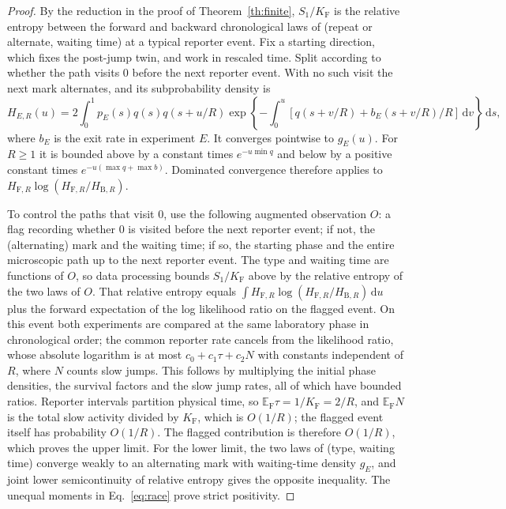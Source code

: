 \documentclass[11pt,a4paper]{article}
\newcommand{\F}{\mathrm F}
\newcommand{\B}{\mathrm B}
\newcommand{\dd}{\,\mathrm d}
\begin{document}
\begin{proof}
By the reduction in the proof of Theorem~\ref{th:finite}, $S_1/K_\F$ is the relative entropy between the forward and backward chronological laws of (repeat or alternate, waiting time) at a typical reporter event. Fix a starting direction, which fixes the post-jump twin, and work in rescaled time. Split according to whether the path visits $0$ before the next reporter event. With no such visit the next mark alternates, and its subprobability density is
\[
 H_{E,R}(u)=2\int_0^1 p_E(s)q(s)q(s+u/R)
 \exp\!\left\{-\int_0^u [q(s+v/R)+b_E(s+v/R)/R]\dd v\right\}\dd s,
\]
where $b_E$ is the exit rate in experiment $E$. It converges pointwise to $g_E(u)$. For $R\ge1$ it is bounded above by a constant times $e^{-u\min q}$ and below by a positive constant times $e^{-u(\max q+\max b)}$. Dominated convergence therefore applies to $H_{\F,R}\log(H_{\F,R}/H_{\B,R})$.

To control the paths that visit $0$, use the following augmented observation $O$: a flag recording whether $0$ is visited before the next reporter event; if not, the (alternating) mark and the waiting time; if so, the starting phase and the entire microscopic path up to the next reporter event. The type and waiting time are functions of $O$, so data processing bounds $S_1/K_\F$ above by the relative entropy of the two laws of $O$. That relative entropy equals $\int H_{\F,R}\log(H_{\F,R}/H_{\B,R})\dd u$ plus the forward expectation of the log likelihood ratio on the flagged event. On this event both experiments are compared at the same laboratory phase in chronological order; the common reporter rate cancels from the likelihood ratio, whose absolute logarithm is at most $c_0+c_1\tau+c_2N$ with constants independent of $R$, where $N$ counts slow jumps. This follows by multiplying the initial phase densities, the survival factors and the slow jump rates, all of which have bounded ratios. Reporter intervals partition physical time, so $\mathbb E_\F\tau=1/K_\F=2/R$, and $\mathbb E_\F N$ is the total slow activity divided by $K_\F$, which is $O(1/R)$; the flagged event itself has probability $O(1/R)$. The flagged contribution is therefore $O(1/R)$, which proves the upper limit. For the lower limit, the two laws of (type, waiting time) converge weakly to an alternating mark with waiting-time density $g_E$, and joint lower semicontinuity of relative entropy gives the opposite inequality. The unequal moments in Eq.~\eqref{eq:race} prove strict positivity.
\end{proof}
\end{document}
